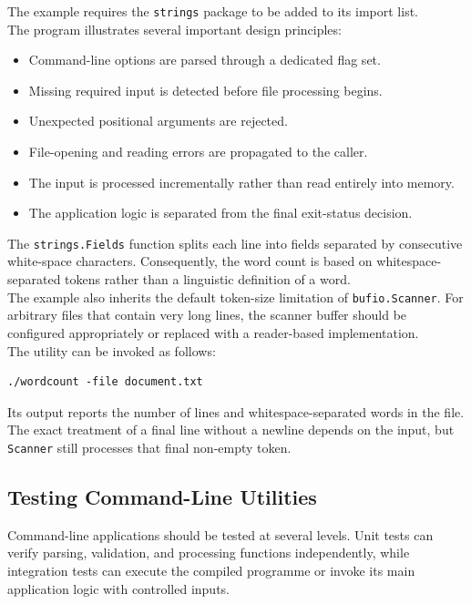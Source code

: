 The example requires the \texttt{strings} package to be added to its import list.\\

The program illustrates several important design principles:

\begin{itemize}
    \item Command-line options are parsed through a dedicated flag set.
    \item Missing required input is detected before file processing begins.
    \item Unexpected positional arguments are rejected.
    \item File-opening and reading errors are propagated to the caller.
    \item The input is processed incrementally rather than read entirely into memory.
    \item The application logic is separated from the final exit-status decision.
\end{itemize}

The \texttt{strings.Fields} function splits each line into fields separated by consecutive white-space characters. Consequently, the word count is based on whitespace-separated tokens rather than a linguistic definition of a word.\\

The example also inherits the default token-size limitation of \texttt{bufio.Scanner}. For arbitrary files that contain very long lines, the scanner buffer should be configured appropriately or replaced with a reader-based implementation. \\

The utility can be invoked as follows:

\begin{lstlisting}
./wordcount -file document.txt
\end{lstlisting}

Its output reports the number of lines and whitespace-separated words in the file. The exact treatment of a final line without a newline depends on the input, but \texttt{Scanner} still processes that final non-empty token.

\subsection{Testing Command-Line Utilities}

Command-line applications should be tested at several levels. Unit tests can verify parsing, validation, and processing functions independently, while integration tests can execute the compiled programme or invoke its main application logic with controlled inputs.\\


